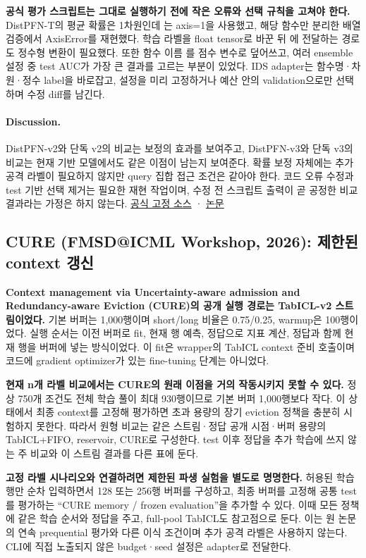 \textbf{공식 평가 스크립트는 그대로 실행하기 전에 작은 오류와 선택 규칙을 고쳐야 한다.} DistPFN-T의 평균 확률은 1차원인데 는 axis=1을 사용했고, 해당 함수만 분리한 배열 검증에서 AxisError를 재현했다. 학습 라벨을 float tensor로 바꾼 뒤 에 전달하는 경로도 정수형 변환이 필요했다. 또한 함수 이름 를 점수 변수로 덮어쓰고, 여러 ensemble 설정 중 test AUC가 가장 큰 결과를 고르는 부분이 있었다. IDS adapter는 함수명·차원·정수 label을 바로잡고, 설정을 미리 고정하거나 예산 안의 validation으로만 선택하며 수정 diff를 남긴다.

\paragraph{Discussion.}
DistPFN-v2와 단독 v2의 비교는 보정의 효과를 보여주고, DistPFN-v3와 단독 v3의 비교는 현재 기반 모델에서도 같은 이점이 남는지 보여준다. 확률 보정 자체에는 추가 공격 라벨이 필요하지 않지만 query 집합 접근 조건은 같아야 한다. 코드 오류 수정과 test 기반 선택 제거는 필요한 재현 작업이며, 수정 전 스크립트 출력이 곧 공정한 비교 결과라는 가정은 하지 않는다.
\href{https://github.com/seunghan96/DistPFN/tree/6b375c8a7624e614e84072c419c4d127229c77b0}{공식 고정 소스} · \href{https://arxiv.org/abs/2605.04363}{논문}

\subsection{CURE (FMSD@ICML Workshop, 2026): 제한된 context 갱신}
\textbf{Context management via Uncertainty-aware admission and Redundancy-aware Eviction (CURE)의 공개 실행 경로는 TabICL-v2 스트림이었다.} 기본 버퍼는 1,000행이며 short/long 비율은 0.75/0.25, warmup은 100행이었다. 실행 순서는 이전 버퍼로 fit, 현재 행 예측, 정답으로 지표 계산, 정답과 함께 현재 행을 버퍼에 넣는 방식이었다. 이 fit은 wrapper의 TabICL context 준비 호출이며 코드에 gradient optimizer가 있는 fine-tuning 단계는 아니었다.

\textbf{현재 n개 라벨 비교에서는 CURE의 원래 이점을 거의 작동시키지 못할 수 있다.} 정상 750개 조건도 전체 학습 풀이 최대 930행이므로 기본 버퍼 1,000행보다 작다. 이 상태에서 최종 context를 고정해 평가하면 초과 용량의 장기 eviction 정책을 충분히 시험하지 못한다. 따라서 원형 비교는 같은 스트림·정답 공개 시점·버퍼 용량의 TabICL+FIFO, reservoir, CURE로 구성한다. test 이후 정답을 추가 학습에 쓰지 않는 주 비교와 이 스트림 결과를 다른 표에 둔다.

\textbf{고정 라벨 시나리오와 연결하려면 제한된 파생 실험을 별도로 명명한다.} 허용된 학습 행만 순차 입력하면서 128 또는 256행 버퍼를 구성하고, 최종 버퍼를 고정해 공통 test를 평가하는 ``CURE memory / frozen evaluation''을 추가할 수 있다. 이때 모든 정책에 같은 학습 순서와 정답을 주고, full-pool TabICL도 참고점으로 둔다. 이는 원 논문의 연속 prequential 평가와 다른 이식 조건이며 추가 공격 라벨은 사용하지 않는다. CLI에 직접 노출되지 않은 budget·seed 설정은  adapter로 전달한다.


